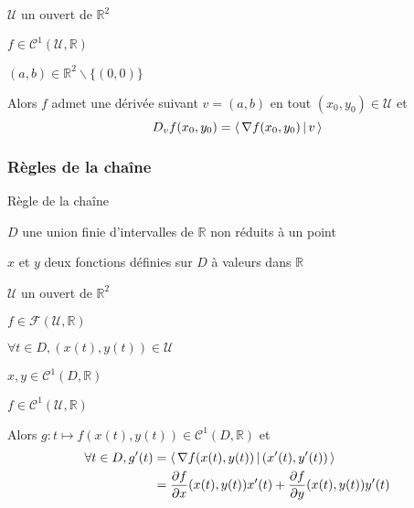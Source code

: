     \begin{coro}{}{}
        \begin{soient}
            \item $\mathcal{U}$ un ouvert de $\mathbb{R}^2$
            \item $f\in \mathcal{C}^1(\mathcal{U},\mathbb{R})$
            \item $(a,b) \in \mathbb{R}^2 \backslash \{ (0,0) \}$
        \end{soient}

        Alors $f$ admet une dérivée suivant $v = (a,b)$ en tout $(x_0,y_0) \in \mathcal{U}$ et 
        \[ D_v f(x_0,y_0) = \left<\,\nabla f(x_0,y_0)\,\middle|\,v\,\right> \]
    \end{coro}

    \subsubsection{Règles de la chaîne}

    \begin{prop}{Règle de la chaîne}{}
        \begin{soient}
            \item $D$ une union finie d’intervalles de $\mathbb{R}$ non réduits à un point
            \item $x$ et $y$ deux fonctions définies sur $D$ à valeurs dans $\mathbb{R}$
            \item $\mathcal{U}$ un ouvert de $\mathbb{R}^2$
            \item $f \in \mathcal{F}(\mathcal{U},\mathbb{R})$
        \end{soient}
        \begin{suppose}
            \item $\forall t \in D, (x(t),y(t) ) \in \mathcal{U}$
            \item $x,y \in \mathcal{C}^1(D,\mathbb{R})$
            \item $f \in \mathcal{C}^1(\mathcal{U},\mathbb{R})$
        \end{suppose}
        Alors $g : t \mapsto f(x(t),y(t)) \in \mathcal{C}^1(D,\mathbb{R})$ et
        \begin{align*}
            \forall t \in D, g'(t) &= \left<\,\nabla f(x(t),y(t))\,\middle|\,(x'(t),y'(t))\,\right> \\
            &= \frac{\partial f}{\partial x}(x(t),y(t)) x'(t) + \frac{\partial f}{\partial y}(x(t),y(t)) y'(t)
        \end{align*} 
    \end{prop}

